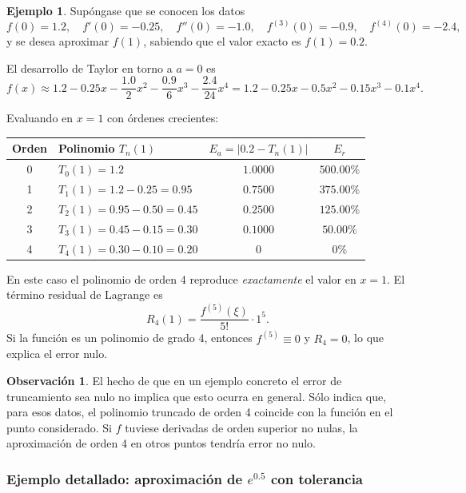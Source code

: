 \documentclass[a4paper,12pt]{article}
\theoremstyle{definition}
\newtheorem{ejemplo}{Ejemplo}[section]
\newtheorem{observacion}{Observación}[section]
\theoremstyle{plain}
\begin{document}
\begin{ejemplo}
Supóngase que se conocen los datos
\[
    f(0) = 1.2, \quad f'(0) = -0.25, \quad f''(0) = -1.0, \quad
    f^{(3)}(0) = -0.9, \quad f^{(4)}(0) = -2.4,
\]
y se desea aproximar $f(1)$, sabiendo que el valor exacto es $f(1) = 0.2$.

El desarrollo de Taylor en torno a $a = 0$ es
\[
    f(x) \approx 1.2 - 0.25x - \frac{1.0}{2}x^2
                - \frac{0.9}{6}x^3 - \frac{2.4}{24}x^4
        = 1.2 - 0.25x - 0.5x^2 - 0.15x^3 - 0.1x^4.
\]

Evaluando en $x = 1$ con órdenes crecientes:

\medskip
\begin{center}
\begin{tabular}{clcc}
\toprule
Orden & Polinomio $T_n(1)$ & $E_a = |0.2 - T_n(1)|$ & $E_r$ \\
\midrule
0 & $T_0(1) = 1.2$ & $1.0000$ & $500.00\%$ \\
1 & $T_1(1) = 1.2 - 0.25 = 0.95$ & $0.7500$ & $375.00\%$ \\
2 & $T_2(1) = 0.95 - 0.50 = 0.45$ & $0.2500$ & $125.00\%$ \\
3 & $T_3(1) = 0.45 - 0.15 = 0.30$ & $0.1000$ & $50.00\%$ \\
4 & $T_4(1) = 0.30 - 0.10 = 0.20$ & $0$ & $0\%$ \\
\bottomrule
\end{tabular}
\end{center}

En este caso el polinomio de orden 4 reproduce \emph{exactamente} el valor en
$x = 1$. El término residual de Lagrange es
\[
    R_4(1) = \frac{f^{(5)}(\xi)}{5!} \cdot 1^5.
\]
Si la función es un polinomio de grado 4, entonces $f^{(5)} \equiv 0$ y
$R_4 = 0$, lo que explica el error nulo.
\end{ejemplo}

\begin{observacion}
El hecho de que en un ejemplo concreto el error de truncamiento sea nulo no
implica que esto ocurra en general. Sólo indica que, para esos datos, el
polinomio truncado de orden 4 coincide con la función en el punto considerado.
Si $f$ tuviese derivadas de orden superior no nulas, la aproximación de orden 4
en otros puntos tendría error no nulo.
\end{observacion}

\subsubsection{Ejemplo detallado: aproximación de $e^{0.5}$ con tolerancia}
\end{document}
